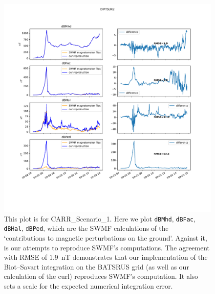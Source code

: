 \documentclass{article}
\begin{document}
\begin{figure}[H]
  \includegraphics[width=\textwidth]{figures/DIPTSUR2-reproduceswmf.pdf}
  \caption{
  This plot is for CARR\_Scenario\_1.
  Here we plot \texttt{dBMhd}, \texttt{dBFac}, \texttt{dBHal}, \texttt{dBPed},
  which are the SWMF calculations of the `contributions to magnetic perturbations on the ground'. Against it, is our attempts to reproduce SWMF's computations.
  The agreement with RMSE of $1.9$~nT demonstrates that our implementation of the Biot--Savart integration on the BATSRUS grid (as well as our calculation of the curl) reproduces SWMF's computation.
  It also sets a scale for the expected numerical integration error.
  }
  \label{CARRreproduceswmf}
\end{figure}
\end{document}
